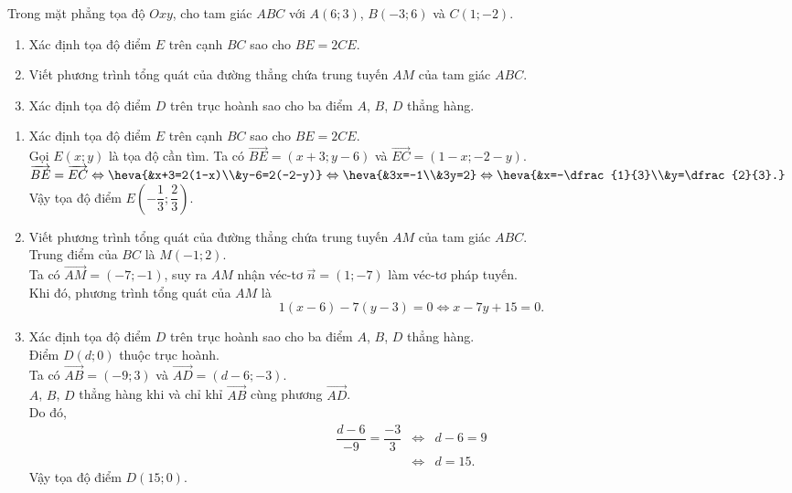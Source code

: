 \begin{bt}%
	Trong mặt phẳng tọa độ $Oxy$, cho tam giác $ABC$ với $A(6;3)$, $B(-3;6)$ và $C(1;-2)$.
	\begin{enumerate}
		\item Xác định tọa độ điểm $E$ trên cạnh $BC$ sao cho $BE=2CE$.
		\item Viết phương trình tổng quát của đường thẳng chứa trung tuyến $AM$ của tam giác $ABC$.
		\item Xác định tọa độ điểm $D$ trên trục hoành sao cho ba điểm $A$, $B$, $D$ thẳng hàng.
	\end{enumerate}
	\loigiai
	{
	\begin{enumerate}
	\item Xác định tọa độ điểm $E$ trên cạnh $BC$ sao cho $BE=2CE$.\\
	Gọi $E(x;y)$ là tọa độ cần tìm. Ta có $\overrightarrow{BE}=(x+3;y-6)$ và $\overrightarrow{EC}=(1-x;-2-y)$.\\
	$\overrightarrow{BE}=\overrightarrow{EC}\Leftrightarrow\heva{&x+3=2(1-x)\\&y-6=2(-2-y)}\Leftrightarrow\heva{&3x=-1\\&3y=2}\Leftrightarrow\heva{&x=-\dfrac{1}{3}\\&y=\dfrac{2}{3}.}$\\
	Vậy tọa độ điểm $E\left(-\dfrac{1}{3};\dfrac{2}{3}\right)$.
	\item Viết phương trình tổng quát của đường thẳng chứa trung tuyến $AM$ của tam giác $ABC$.\\
	Trung điểm của $BC$ là $M(-1;2)$.\\
	Ta có $\overrightarrow{AM}=(-7;-1)$, suy ra $AM$ nhận véc-tơ $\overrightarrow{n}=(1;-7)$ làm véc-tơ pháp tuyến.\\
	Khi đó, phương trình tổng quát của $AM$ là $$1(x-6)-7(y-3)=0\Leftrightarrow x-7y+15=0.$$
	\item Xác định tọa độ điểm $D$ trên trục hoành sao cho ba điểm $A$, $B$, $D$ thẳng hàng.\\
	Điểm $D(d;0)$ thuộc trục hoành.\\
	Ta có $\overrightarrow{AB}=(-9;3)$ và $\overrightarrow{AD}=(d-6;-3)$.\\
	$A$, $B$, $D$ thẳng hàng khi và chỉ khỉ $\overrightarrow{AB}$ cùng phương $\overrightarrow{AD}$.\\
	Do đó, 
	\allowdisplaybreaks
	\begin{eqnarray*}
		\dfrac{d-6}{-9}=\dfrac{-3}{3}&\Leftrightarrow& d-6=9\\
		&\Leftrightarrow& d=15.
	\end{eqnarray*}
	Vậy tọa độ điểm $D(15;0)$.
\end{enumerate}
	}
\end{bt}


